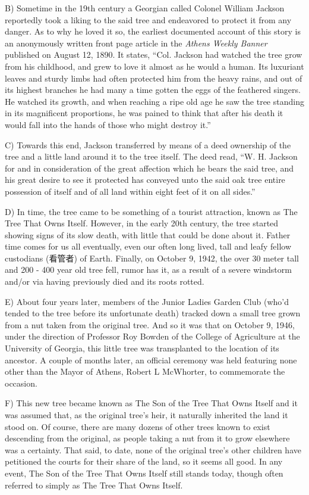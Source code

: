 \documentclass[UTF8,11pt]{ctexart}
\begin{document}
B) Sometime in the 19th century a Georgian called Colonel William Jackson reportedly took a liking to the said tree and endeavored to protect it from any danger. As to why he loved it so, the earliest documented account of this story is an anonymously written front page article in the \textit{Athens Weekly Banner} published on August 12, 1890. It states, “Col. Jackson had watched the tree grow from his childhood, and grew to love it almost as he would a human. Its luxuriant leaves and sturdy limbs had often protected him from the heavy rains, and out of its highest branches he had many a time gotten the eggs of the feathered singers. He watched its growth, and when reaching a ripe old age he saw the tree standing in its magnificent proportions, he was pained to think that after his death it would fall into the hands of those who might destroy it.”


C) Towards this end, Jackson transferred by means of a deed ownership of the tree and a little land around it to the tree itself. The deed read, “W. H. Jackson for and in consideration of the great affection which he bears the said tree, and his great desire to see it protected has conveyed unto the said oak tree entire possession of itself and of all land within eight feet of it on all sides.”


D) In time, the tree came to be something of a tourist attraction, known as The Tree That Owns Itself. However, in the early 20th century, the tree started showing signs of its slow death, with little that could be done about it. Father time comes for us all eventually, even our often long lived, tall and leafy fellow custodians (看管者) of Earth. Finally, on October 9, 1942, the over 30 meter tall and 200 - 400 year old tree fell, rumor has it, as a result of a severe windstorm and/or via having previously died and its roots rotted.


E) About four years later, members of the Junior Ladies Garden Club (who’d tended to the tree before its unfortunate death) tracked down a small tree grown from a nut taken from the original tree. And so it was that on October 9, 1946, under the direction of Professor Roy Bowden of the College of Agriculture at the University of Georgia, this little tree was transplanted to the location of its ancestor. A couple of months later, an official ceremony was held featuring none other than the Mayor of Athens, Robert L McWhorter, to commemorate the occasion.


F) This new tree became known as The Son of the Tree That Owns Itself and it was assumed that, as the original tree’s heir, it naturally inherited the land it stood on. Of course, there are many dozens of other trees known to exist descending from the original, as people taking a nut from it to grow elsewhere was a certainty. That said, to date, none of the original tree’s other children have petitioned the courts for their share of the land, so it seems all good. In any event, The Son of the Tree That Owns Itself still stands today, though often referred to simply as The Tree That Owns Itself.
\end{document}
